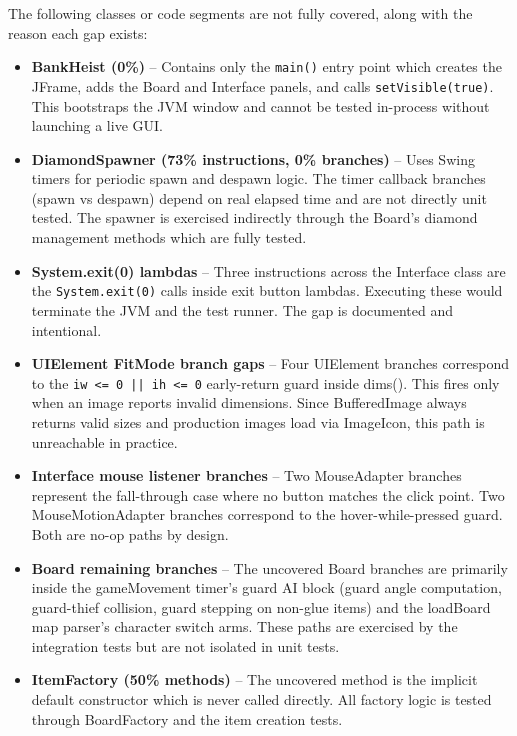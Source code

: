 \documentclass[12pt]{article}
\begin{document}
The following classes or code segments are not fully covered, along with the reason each gap exists:

\begin{itemize}

\item \textbf{BankHeist (0\%)} -- Contains only the \texttt{main()} entry point which creates the JFrame, adds the Board and Interface panels, and calls \texttt{setVisible(true)}. This bootstraps the JVM window and cannot be tested in-process without launching a live GUI.

\item \textbf{DiamondSpawner (73\% instructions, 0\% branches)} -- Uses Swing timers for periodic spawn and despawn logic. The timer callback branches (spawn vs despawn) depend on real elapsed time and are not directly unit tested. The spawner is exercised indirectly through the Board's diamond management methods which are fully tested.

\item \textbf{System.exit(0) lambdas} -- Three instructions across the Interface class are the \texttt{System.exit(0)} calls inside exit button lambdas. Executing these would terminate the JVM and the test runner. The gap is documented and intentional.

\item \textbf{UIElement FitMode branch gaps} -- Four UIElement branches correspond to the \texttt{iw <= 0 || ih <= 0} early-return guard inside dims(). This fires only when an image reports invalid dimensions. Since BufferedImage always returns valid sizes and production images load via ImageIcon, this path is unreachable in practice.

\item \textbf{Interface mouse listener branches} -- Two MouseAdapter branches represent the fall-through case where no button matches the click point. Two MouseMotionAdapter branches correspond to the hover-while-pressed guard. Both are no-op paths by design.

\item \textbf{Board remaining branches} -- The uncovered Board branches are primarily inside the gameMovement timer's guard AI block (guard angle computation, guard-thief collision, guard stepping on non-glue items) and the loadBoard map parser's character switch arms. These paths are exercised by the integration tests but are not isolated in unit tests.

\item \textbf{ItemFactory (50\% methods)} -- The uncovered method is the implicit default constructor which is never called directly. All factory logic is tested through BoardFactory and the item creation tests.

\end{itemize}
\end{document}
